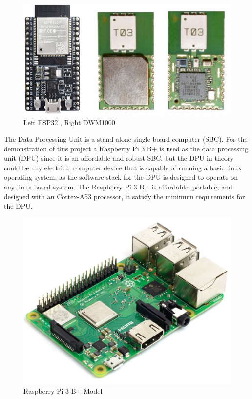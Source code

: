 \medskip
\begin{figure}[H]
\centering
    \includegraphics[scale=0.75]{./images/dwm_esp.png}
    \caption{Left ESP32 \cite{R2-1-1-2}, Right DWM1000}
    \label{dwm_esp}
\end{figure}

The Data Processing Unit is a stand alone single board computer (\Gls{SBC}). For the demonstration of this project a Raspberry Pi 3 B+ is used as the data processing unit (\Gls{DPU}) since it is an affordable and robust SBC, but the DPU in theory could be any electrical computer device that is capable of running a basic linux operating system; as the software stack for the DPU is designed to operate on any linux based system. The Raspberry Pi 3 B+ is affordable, portable, and designed with an Cortex-A53 processor, it satisfy the minimum requirements for the DPU.

\medskip
\begin{figure}[H]
\centering
    \includegraphics[scale=1]{./images/pi.jpg}
    \caption{Raspberry Pi 3 B+ Model \cite{R2-1-1-3}}
    \label{pi}
\end{figure}



